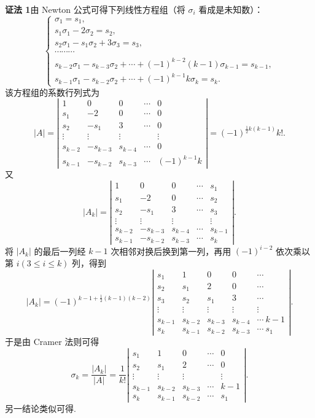 \documentclass[UTF8, 12pt, fontset=fandol, oneside]{ctexart}
\begin{document}
\noindent\textbf{证法 1}\quad 由 Newton 公式可得下列线性方程组（将 $\sigma_i$ 看成是未知数）：
\[
\left\{
\begin{array}{l}
\sigma_1=s_1,\\
s_1\sigma_1-2\sigma_2=s_2,\\
s_2\sigma_1-s_1\sigma_2+3\sigma_3=s_3,\\
\cdots\cdots\cdots\\
s_{k-2}\sigma_1-s_{k-3}\sigma_2+\cdots+(-1)^{k-2}(k-1)\sigma_{k-1}=s_{k-1},\\
s_{k-1}\sigma_1-s_{k-2}\sigma_2+\cdots+(-1)^{k-1}k\sigma_k=s_k.
\end{array}
\right.
\]
该方程组的系数行列式为
\[
|A|=
\left|\begin{array}{ccccc}
1 & 0 & 0 & \cdots & 0\\
s_1 & -2 & 0 & \cdots & 0\\
s_2 & -s_1 & 3 & \cdots & 0\\
\vdots & \vdots & \vdots &        & \vdots\\
s_{k-2} & -s_{k-3} & s_{k-4} & \cdots & 0\\
s_{k-1} & -s_{k-2} & s_{k-3} & \cdots & (-1)^{k-1}k
\end{array}\right|
=(-1)^{\frac12 k(k-1)}k!.
\]
又
\[
|A_k|=
\left|\begin{array}{ccccc}
1 & 0 & 0 & \cdots & s_1\\
s_1 & -2 & 0 & \cdots & s_2\\
s_2 & -s_1 & 3 & \cdots & s_3\\
\vdots & \vdots & \vdots &        & \vdots\\
s_{k-2} & -s_{k-3} & s_{k-4} & \cdots & s_{k-1}\\
s_{k-1} & -s_{k-2} & s_{k-3} & \cdots & s_k
\end{array}\right|.
\]
将 $|A_k|$ 的最后一列经 $k-1$ 次相邻对换后换到第一列，再用 $(-1)^{i-2}$ 依次乘以第 $i(3\le i\le k)$ 列，得到
\[
|A_k|=(-1)^{k-1+\frac12(k-1)(k-2)}
\left|\begin{array}{ccccc}
s_1 & 1 & 0 & 0 & \cdots\\
s_2 & s_1 & 2 & 0 & \cdots\\
s_3 & s_2 & s_1 & 3 & \cdots\\
\vdots & \vdots & \vdots & \vdots & \vdots\\
s_{k-1} & s_{k-2} & s_{k-3} & s_{k-4} & \cdots\ k-1\\
s_k & s_{k-1} & s_{k-2} & s_{k-3} & \cdots\ s_1
\end{array}\right|.
\]
于是由 Cramer 法则可得
\[
\sigma_k=\frac{|A_k|}{|A|}=\frac1{k!}
\left|\begin{array}{ccccc}
s_1 & 1 & 0 & \cdots & 0\\
s_2 & s_1 & 2 & \cdots & 0\\
\vdots & \vdots & \vdots &        & \vdots\\
s_{k-1} & s_{k-2} & s_{k-3} & \cdots & k-1\\
s_k & s_{k-1} & s_{k-2} & \cdots & s_1
\end{array}\right|.
\]
另一结论类似可得.
\end{document}

